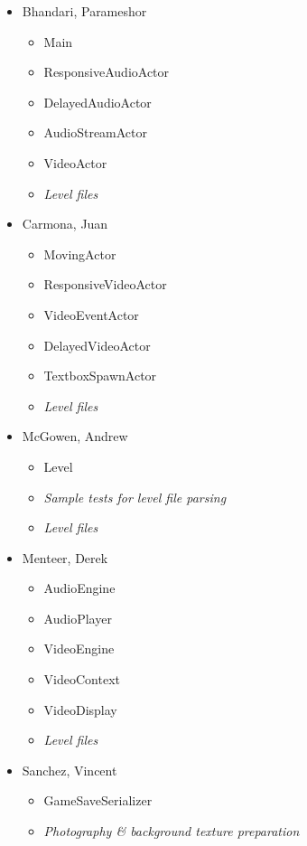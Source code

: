 \documentclass{article}
\begin{document}
      \begin{multicols}{2}
      \begin{itemize}
        \item Bhandari, Parameshor
        	\begin{itemize}
				\item Main
				\item ResponsiveAudioActor
				\item DelayedAudioActor
				\item AudioStreamActor
				\item VideoActor
				\item \emph{Level files}
			\end{itemize}
        \item Carmona, Juan 
        	\begin{itemize}
				\item MovingActor
				\item ResponsiveVideoActor
				\item VideoEventActor
				\item DelayedVideoActor 
				\item TextboxSpawnActor 
				\item \emph{Level files}
			\end{itemize}
        \item McGowen, Andrew 
        	\begin{itemize}
				\item Level 
				\item \emph{Sample tests for level file parsing} 
				\item \emph{Level files}
			\end{itemize}
        \item Menteer, Derek 
        	\begin{itemize}
				\item AudioEngine
				\item AudioPlayer
				\item VideoEngine
				\item VideoContext 
				\item VideoDisplay
				\item \emph{Level files}
			\end{itemize}
        \item Sanchez, Vincent 
        	\begin{itemize}
				\item GameSaveSerializer 
				\item \emph{Photography \& background texture preparation} 

\end{itemize}
\end{itemize}
\end{multicols}
\end{document}

